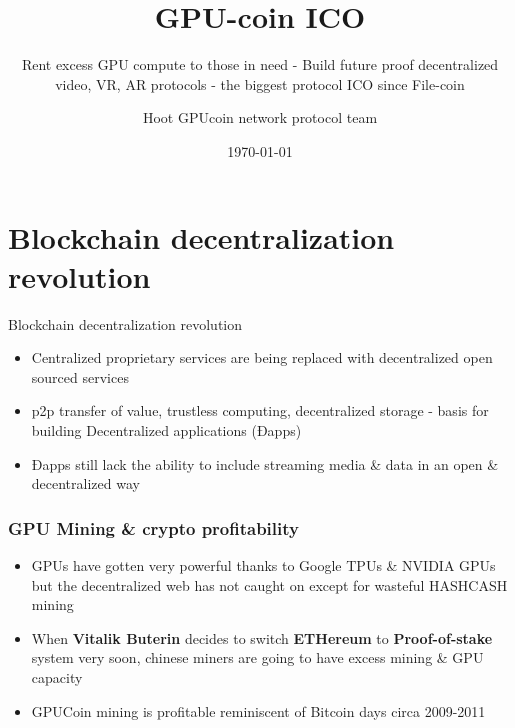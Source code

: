 \documentclass[10pt,handout]{beamer}
\title{ GPU-coin ICO }
\subtitle{Rent excess GPU compute to those in need - Build future proof decentralized video, VR, AR protocols - the biggest protocol ICO since File-coin}
\date{\today}
\author{Hoot GPUcoin network protocol team}
\institute{Hoot GPUcoin Foundation}
\begin{document}
\maketitle


\section{Blockchain decentralization revolution}
\begin{frame}[fragile]{Blockchain decentralization revolution}
 \begin{itemize}[<+-| alert@+>]%
	 
\item Centralized proprietary services are being replaced with decentralized open sourced services
\item p2p transfer of value, trustless computing, decentralized storage - basis for building Decentralized applications (Ðapps)
 \item Ðapps still lack the ability to include streaming media \& data in an open \& decentralized way
\end{itemize}

\end{frame}

\begin{frame}[t]\frametitle{GPU Mining \& crypto profitability}
    
\begin{itemize}[<+-| alert@+>]
\item GPUs have gotten very powerful thanks to Google TPUs \& NVIDIA GPUs but the decentralized web has not caught on except for wasteful HASHCASH mining
\item When \textbf{Vitalik Buterin} decides to switch \textbf{ETHereum} to \textbf{Proof-of-stake} system very soon, chinese miners are going to have excess mining \& GPU capacity
\item GPUCoin mining is profitable reminiscent of Bitcoin days circa 2009-2011
\end{itemize}

\end{frame}
\end{document}

